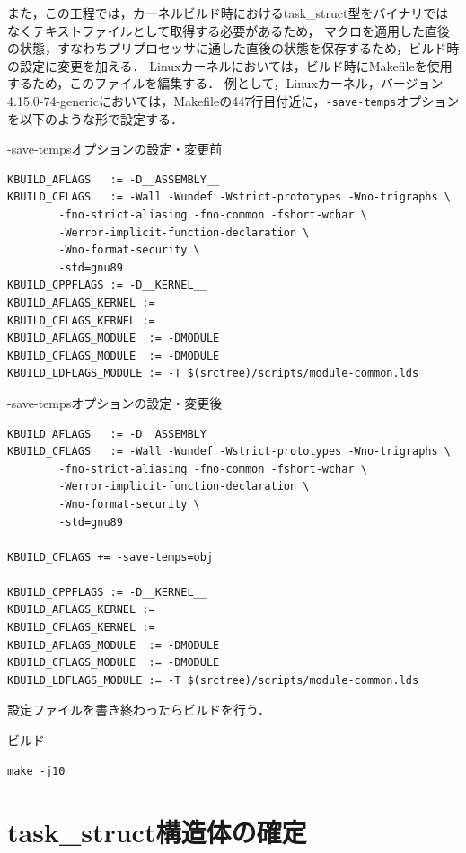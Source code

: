 また，この工程では，カーネルビルド時におけるtask\_struct型をバイナリではなくテキストファイルとして取得する必要があるため，
マクロを適用した直後の状態，すなわちプリプロセッサに通した直後の状態を保存するため，ビルド時の設定に変更を加える．
Linuxカーネルにおいては，ビルド時にMakefileを使用するため，このファイルを編集する．
例として，Linuxカーネル，バージョン4.15.0-74-genericにおいては，Makefileの447行目付近に，\verb|-save-temps|オプションを以下のような形で設定する．

\begin{itembox}[l]{-save-tempsオプションの設定・変更前}
    \begin{verbatim}
KBUILD_AFLAGS   := -D__ASSEMBLY__
KBUILD_CFLAGS   := -Wall -Wundef -Wstrict-prototypes -Wno-trigraphs \
        -fno-strict-aliasing -fno-common -fshort-wchar \
        -Werror-implicit-function-declaration \
        -Wno-format-security \
        -std=gnu89
KBUILD_CPPFLAGS := -D__KERNEL__
KBUILD_AFLAGS_KERNEL :=
KBUILD_CFLAGS_KERNEL :=
KBUILD_AFLAGS_MODULE  := -DMODULE
KBUILD_CFLAGS_MODULE  := -DMODULE
KBUILD_LDFLAGS_MODULE := -T $(srctree)/scripts/module-common.lds
    \end{verbatim}
\end{itembox}

\begin{itembox}[l]{-save-tempsオプションの設定・変更後}
    \begin{verbatim}
KBUILD_AFLAGS   := -D__ASSEMBLY__
KBUILD_CFLAGS   := -Wall -Wundef -Wstrict-prototypes -Wno-trigraphs \
        -fno-strict-aliasing -fno-common -fshort-wchar \
        -Werror-implicit-function-declaration \
        -Wno-format-security \
        -std=gnu89

KBUILD_CFLAGS += -save-temps=obj

KBUILD_CPPFLAGS := -D__KERNEL__
KBUILD_AFLAGS_KERNEL :=
KBUILD_CFLAGS_KERNEL :=
KBUILD_AFLAGS_MODULE  := -DMODULE
KBUILD_CFLAGS_MODULE  := -DMODULE
KBUILD_LDFLAGS_MODULE := -T $(srctree)/scripts/module-common.lds
    \end{verbatim}
\end{itembox}

設定ファイルを書き終わったらビルドを行う．

\begin{itembox}[l]{ビルド}
    \begin{verbatim}
make -j10
    \end{verbatim}
\end{itembox}

\section{task\_struct構造体の確定}
\label{section:define_task_struct}

